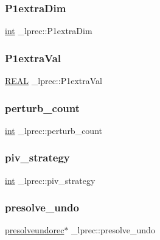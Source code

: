\subsubsection{\texorpdfstring{P1extra\+Dim}{P1extraDim}}
{\footnotesize\ttfamily \hyperlink{lp__lib_8h_adeb9ec6400320e4923ac9d836d509ddb}{int} \+\_\+lprec\+::\+P1extra\+Dim}

\mbox{\label{struct__lprec_a29af531363822a4a58b0d2ec6fc4eba5}} 
\subsubsection{\texorpdfstring{P1extra\+Val}{P1extraVal}}
{\footnotesize\ttfamily \hyperlink{lp__lib_8h_a92bd5e363d131fa73669358edb232dce}{R\+E\+AL} \+\_\+lprec\+::\+P1extra\+Val}

\mbox{\label{struct__lprec_a70458a41524f52fec71f8932447831fa}} 
\subsubsection{\texorpdfstring{perturb\+\_\+count}{perturb\_count}}
{\footnotesize\ttfamily \hyperlink{lp__lib_8h_adeb9ec6400320e4923ac9d836d509ddb}{int} \+\_\+lprec\+::perturb\+\_\+count}

\mbox{\label{struct__lprec_aa63ae6ad44321f7c4fe76a3342f1dcf0}} 
\subsubsection{\texorpdfstring{piv\+\_\+strategy}{piv\_strategy}}
{\footnotesize\ttfamily \hyperlink{lp__lib_8h_adeb9ec6400320e4923ac9d836d509ddb}{int} \+\_\+lprec\+::piv\+\_\+strategy}

\mbox{\label{struct__lprec_a4108e9e1da8fa452ffa06e478c0aadb7}} 
\subsubsection{\texorpdfstring{presolve\+\_\+undo}{presolve\_undo}}
{\footnotesize\ttfamily \hyperlink{lp__lib_8h_af509ae32a68c23ff92c7767fc4359a5e}{presolveundorec}$\ast$ \+\_\+lprec\+::presolve\+\_\+undo}

